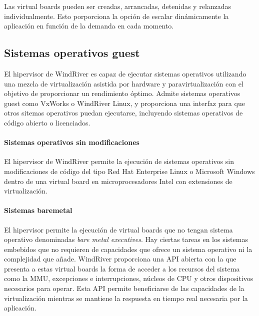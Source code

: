 Las virtual boards pueden ser creadas, arrancadas, detenidas y relanzadas individualmente. Esto porporciona la opción de escalar dinámicamente la aplicación en función de la demanda en cada momento.

\subsection{Sistemas operativos guest}
El hipervisor de WindRiver es capaz de ejecutar sistemas operativos utilizando una mezcla de virtualización asistida por hardware y paravirtualización con el objetivo de proporcionar un rendimiento óptimo. Admite sistemas operativos guest como VxWorks o WindRiver Linux, y proporciona una interfaz para que otros sitemas operativos puedan ejecutarse, incluyendo sistemas operativos de código abierto o licenciados.\\

\paragraph{Sistemas operativos sin modificaciones} El hipervisor de WindRiver permite la ejecución de sistemas operativos sin modificaciones de código del tipo Red Hat Enterprise Linux o Microsoft Windows dentro de una virtual board en microprocesadores Intel con extensiones de virtualización.\\

\paragraph{Sistemas baremetal}
El hipervisor permite la ejecución de virtual boards que no tengan sistema operativo denominadas \textit{bare metal executives}. Hay ciertas tareas en los sistemas embebidos que no requieren de capacidades que ofrece un sistema operativo ni la complejidad que añade. WindRiver proporciona una API abierta con la que presenta a estas virtual boards la forma de acceder a los recursos del sistema como la \acrshort{MMU}, excepciones e interrupciones, núcleos de CPU y otros dispositivos necesarios para operar. Esta API permite beneficiarse de las capacidades de la virtualización mientras se mantiene la respuesta en tiempo real necesaria por la aplicación.

